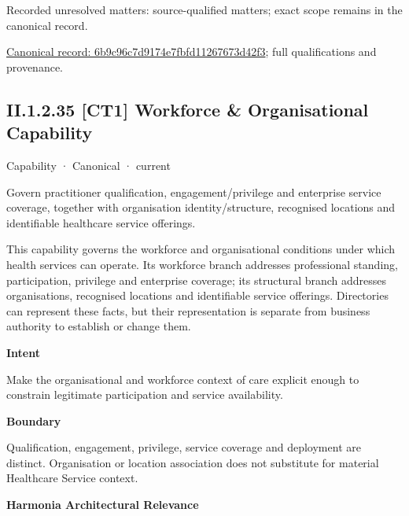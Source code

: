 {\small Recorded unresolved matters: source-qualified matters; exact scope remains in the canonical record.}\par
{\footnotesize \href{../../../../continuum/strategy/capability/6b9c96c7d9174e7fbfd11267673d42f3.md}{Canonical record: 6b9c96c7d9174e7fbfd11267673d42f3}; full qualifications and provenance.}\par
\subsection*{II.1.2.35 [CT1] Workforce \& Organisational Capability}
\label{navigation:II.1.2.35}

\label{element:631b43664bfb4c50ac8cf4958b2c347d}
{\small Capability · Canonical · current}\par

Govern practitioner qualification, engagement/privilege and enterprise service coverage, together with organisation identity/structure, recognised locations and identifiable healthcare service offerings.



This capability governs the workforce and organisational conditions under which health services can operate. Its workforce branch addresses professional standing, participation, privilege and enterprise coverage; its structural branch addresses organisations, recognised locations and identifiable service offerings. Directories can represent these facts, but their representation is separate from business authority to establish or change them.



\textbf{Intent}



Make the organisational and workforce context of care explicit enough to constrain legitimate participation and service availability.



\textbf{Boundary}



Qualification, engagement, privilege, service coverage and deployment are distinct. Organisation or location association does not substitute for material Healthcare Service context.



\textbf{Harmonia Architectural Relevance}



